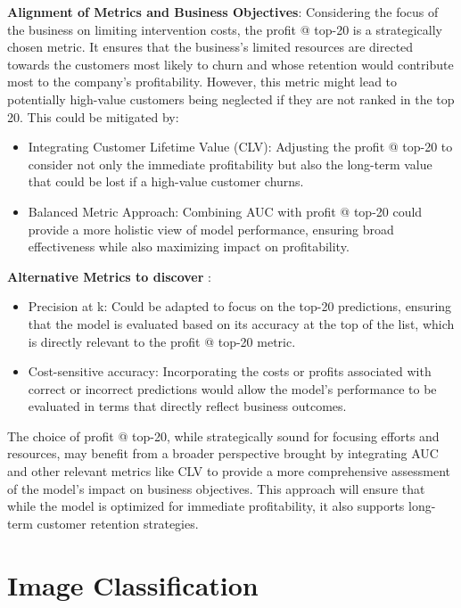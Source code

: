 \documentclass{article}
\begin{document}
\textbf{Alignment of Metrics and Business Objectives}:
Considering the focus of the business on limiting intervention costs, the profit @ top-20 is a strategically chosen metric. It ensures that the business's limited resources are directed towards the customers most likely to churn and whose retention would contribute most to the company's profitability. However, this metric might lead to potentially high-value customers being neglected if they are not ranked in the top 20. This could be mitigated by:
\begin{itemize}
 \item Integrating Customer Lifetime Value (CLV): Adjusting the profit @ top-20 to consider not only the immediate profitability but also the long-term value that could be lost if a high-value customer churns.
 \item Balanced Metric Approach: Combining AUC with profit @ top-20 could provide a more holistic view of model performance, ensuring broad effectiveness while also maximizing impact on profitability.
\end{itemize}

\textbf{Alternative Metrics to discover }:
\begin{itemize}
\item Precision at k: Could be adapted to focus on the top-20 predictions, ensuring that the model is evaluated based on its accuracy at the top of the list, which is directly relevant to the profit @ top-20 metric.
\item Cost-sensitive accuracy: Incorporating the costs or profits associated with correct or incorrect predictions would allow the model's performance to be evaluated in terms that directly reflect business outcomes.
\end{itemize}

The choice of profit @ top-20, while strategically sound for focusing efforts and resources, may benefit from a broader perspective brought by integrating AUC and other relevant metrics like CLV to provide a more comprehensive assessment of the model's impact on business objectives. This approach will ensure that while the model is optimized for immediate profitability, it also supports long-term customer retention strategies.








\section{Image Classification}
\end{document}
